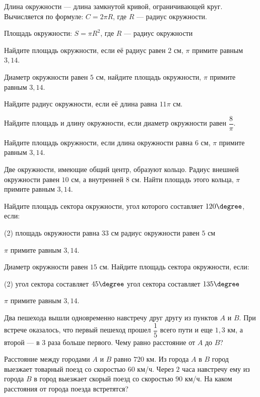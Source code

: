 \begin{class}[number=5]
	\begin{definit}
		Длина окружности --- длина замкнутой кривой, ограничивающей круг. Вычисляется по формуле: \( C = 2 \pi R \), где \(R\) --- радиус окружности.
	\end{definit}
	\begin{definit}
		Площадь окружности: \( S = \pi R^2 \), где \(R\) --- радиус окружности
	\end{definit}
	\begin{listofex}
		\item Найдите площадь окружности, если её радиус равен \( 2 \) см, \(\pi\) примите равным \(3,14\).
		\item Диаметр окружности равен \(5\) см, найдите площадь окружности, \(\pi\) примите равным \(3,14\).
		\item Найдите радиус окружности, если её длина равна \( 11\pi \) см.
		\item Найдите площадь и длину окружности, если диаметр окружности равен \( \dfrac{8}{\pi} \).
		\item Найдите площадь окружности, если длина окружности равна \(6\) см, \(\pi\) примите равным \(3,14\).
		\item Две окружности, имеющие общий центр, образуют кольцо. Радиус внешней окружности равен \(10\) см, а внутренней \(8\) см. Найти площадь этого кольца, \(\pi\) примите равным \(3,14\).
		
		\item Найдите площадь сектора окружности, угол которого составляет \(120 \degree\), если:
		\begin{tasks}(2)
			\task площадь окружности равна \( 33 \) см
			\task радиус окружности равен \( 5 \) см
		\end{tasks}
		\(\pi\) примите равным \(3,14\).
		\item Диаметр окружности равен \(15\) см. Найдите площадь сектора окружности, если:
		\begin{tasks}(2)
			\task угол сектора составляет \( 45 \degree \)
			\task угол сектора составляет \( 135 \degree \)
		\end{tasks}
		\(\pi\) примите равным \(3,14\).
		\item Два пешехода вышли одновременно навстречу друг другу из пунктов \(A\) и \(B\). При встрече оказалось, что первый пешеход прошел \(\dfrac{ 1 }{ 5 }\) всего пути и еще \(1,3\) км, а второй --- в \(3\) раза больше первого. Чему равно расстояние от \(A\) до \(B\)?
		\item Расстояние между городами \(A\) и \(B\) равно \(720\) км. Из города \(A\) в \(B\) город выезжает товарный поезд со скоростью \(60\) км/ч. Через \(2\) часа навстречу ему из города \(B\) в город выезжает скорый поезд со скоростью \(90\) км/ч. На каком расстояния от города поезда встретятся?
	\end{listofex}
\end{class}

